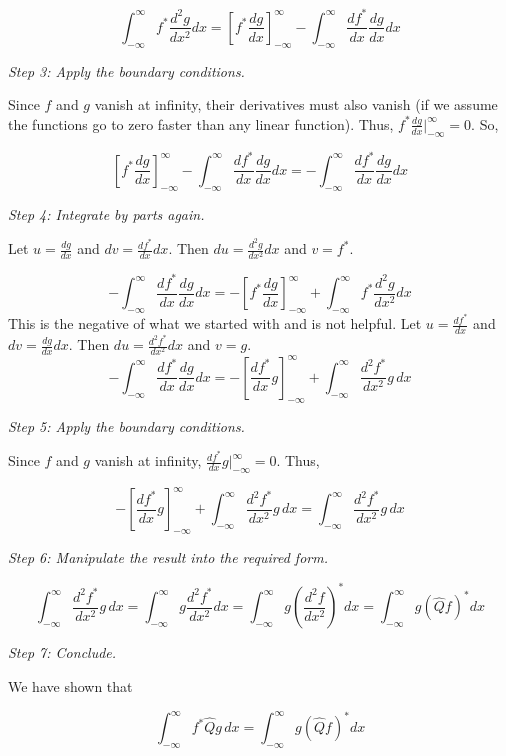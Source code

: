 \documentclass{article}
\begin{document}
\[
\int_{-\infty}^{\infty} f^* \frac{d^2 g}{dx^2} dx = \left[ f^* \frac{dg}{dx} \right]_{-\infty}^{\infty} - \int_{-\infty}^{\infty} \frac{df^*}{dx} \frac{dg}{dx} dx
\]

\textit{Step 3: Apply the boundary conditions.}

Since $f$ and $g$ vanish at infinity, their derivatives must also vanish (if we assume the functions go to zero faster than any linear function).  Thus, $f^* \frac{dg}{dx} \Big|_{-\infty}^{\infty} = 0$. So,

\[
\left[ f^* \frac{dg}{dx} \right]_{-\infty}^{\infty} - \int_{-\infty}^{\infty} \frac{df^*}{dx} \frac{dg}{dx} dx = - \int_{-\infty}^{\infty} \frac{df^*}{dx} \frac{dg}{dx} dx
\]

\textit{Step 4: Integrate by parts again.}

Let $u = \frac{dg}{dx}$ and $dv = \frac{df^*}{dx} dx$. Then $du = \frac{d^2 g}{dx^2} dx$ and $v = f^*$.

\[
- \int_{-\infty}^{\infty} \frac{df^*}{dx} \frac{dg}{dx} dx = - \left[ f^* \frac{dg}{dx} \right]_{-\infty}^{\infty} + \int_{-\infty}^{\infty} f^* \frac{d^2 g}{dx^2} dx
\]
This is the negative of what we started with and is not helpful.
Let $u = \frac{df^*}{dx}$ and $dv = \frac{dg}{dx} dx$. Then $du = \frac{d^2 f^*}{dx^2} dx$ and $v = g$.
\[
-\int_{-\infty}^{\infty} \frac{df^*}{dx} \frac{dg}{dx} dx = - \left[ \frac{df^*}{dx} g \right]_{-\infty}^{\infty} + \int_{-\infty}^{\infty} \frac{d^2 f^*}{dx^2} g \, dx
\]

\textit{Step 5: Apply the boundary conditions.}

Since $f$ and $g$ vanish at infinity, $\frac{df^*}{dx} g \Big|_{-\infty}^{\infty} = 0$. Thus,

\[
- \left[ \frac{df^*}{dx} g \right]_{-\infty}^{\infty} + \int_{-\infty}^{\infty} \frac{d^2 f^*}{dx^2} g \, dx = \int_{-\infty}^{\infty} \frac{d^2 f^*}{dx^2} g \, dx
\]

\textit{Step 6: Manipulate the result into the required form.}

\[
\int_{-\infty}^{\infty} \frac{d^2 f^*}{dx^2} g \, dx = \int_{-\infty}^{\infty} g \frac{d^2 f^*}{dx^2} dx = \int_{-\infty}^{\infty} g \left( \frac{d^2 f}{dx^2} \right)^* dx = \int_{-\infty}^{\infty} g (\hat{Q} f)^* dx
\]

\textit{Step 7: Conclude.}

We have shown that

\[
\int_{-\infty}^{\infty} f^* \hat{Q} g \, dx = \int_{-\infty}^{\infty} g (\hat{Q} f)^* dx
\]
\end{document}

